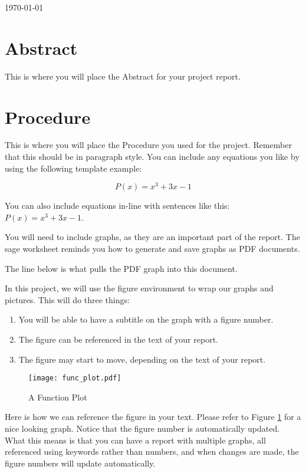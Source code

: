 \documentclass[11pt]{article}
\begin{document}
\today

\begin{report}
\section{Abstract}
This is where you will place the Abstract for your project report.

\section{Procedure}
This is where you will place the Procedure you used for the project. Remember that this should be in paragraph style. You can include any equations you like by using the following template example:

\[
    P(x) = x^3 + 3x - 1
\]

You can also include equations in-line with sentences like this: $P(x)=x^3+3x-1$.

You will need to include graphs, as they are an important part of the report. The sage worksheet reminds you how to generate and save graphs as PDF documents.

The line below is what pulls the PDF graph into this document.

In this project, we will use the figure environment to wrap our graphs and pictures. This will do three things:
\begin{enumerate}
    \item You will be able to have a subtitle on the graph with a figure number.
    \item The figure can be referenced in the text of your report.
    \item The figure may start to move, depending on the text of your report.
\end{enumerate}

\begin{figure}
\texttt{[image: func\_plot.pdf]}
\caption{\label{l_func_plot} A Function Plot}
\end{figure}

Here is how we can reference the figure in your text. Please refer to Figure \ref{l_func_plot} for a nice looking graph. Notice that the figure number is automatically updated. What this means is that you can have a report with multiple graphs, all referenced using keywords rather than numbers, and when changes are made, the figure numbers will update automatically.


\end{report}
\end{document}
